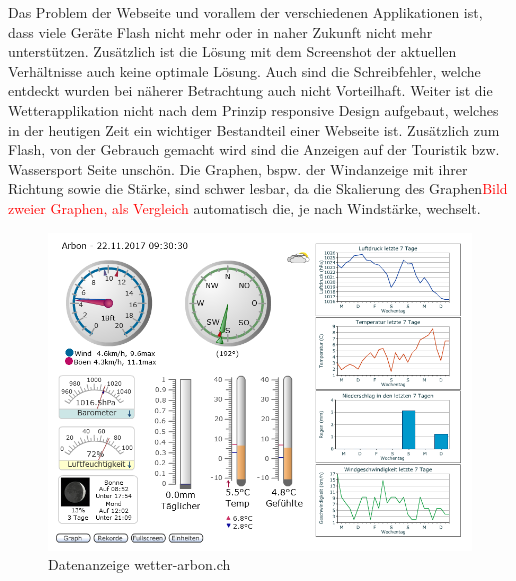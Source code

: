\documentclass[a4paper,ngerman, 11pt, pagesize]{report}
\newcommand\Diskussionspunkt[1]{\textcolor{red}{#1}}
\begin{document}
Das Problem der Webseite und vorallem der verschiedenen Applikationen ist, dass viele Geräte Flash nicht mehr oder in naher Zukunft nicht mehr unterstützen. Zusätzlich ist die Lösung mit dem Screenshot der aktuellen Verhältnisse auch keine optimale Lösung. Auch sind die Schreibfehler, welche entdeckt wurden bei näherer Betrachtung auch nicht Vorteilhaft. Weiter ist die Wetterapplikation nicht nach dem Prinzip responsive Design aufgebaut, welches in der heutigen Zeit ein wichtiger Bestandteil einer Webseite ist. Zusätzlich zum Flash, von der Gebrauch gemacht wird sind die Anzeigen auf der Touristik bzw. Wassersport Seite unschön. Die Graphen, bspw. der Windanzeige mit ihrer Richtung sowie die Stärke, sind schwer lesbar, da die Skalierung des Graphen\Diskussionspunkt{Bild zweier Graphen, als Vergleich} automatisch die, je nach Windstärke, wechselt.

\begin{figure}[htbp]
	\centering
	\includegraphics[width=0.9\linewidth]{img/grafik}
	\caption{Datenanzeige wetter-arbon.ch}
	\label{img:grafik-dummy}
\end{figure}
\end{document}
